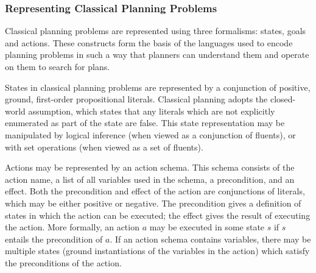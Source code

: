 \subsubsection{Representing Classical Planning Problems}

Classical planning problems are represented using three formalisms: states, goals and actions. These constructs form the basis of the languages used to encode planning problems in such a way that planners can understand them and operate on them to search for plans. 

States in classical planning problems are represented by a conjunction of positive, ground, first-order propositional literals. Classical planning adopts the closed-world assumption, which states that any literals which are not explicitly enumerated as part of the state are false. This state representation may be manipulated by logical inference (when viewed as a conjunction of fluents), or with set operations (when viewed as a set of fluents).

% 

Actions may be represented by an action schema. This schema consists of the action name, a list of all variables used in the schema, a precondition, and an effect. Both the precondition and effect of the action are conjunctions of literals, which may be either positive or negative. The precondition gives a definition of states in which the action can be executed; the effect gives the result of executing the action. More formally, an action $a$ may be executed in some state $s$ if $s$ entails the precondition of $a$. If an action schema contains variables, there may be multiple states (ground instantiations of the variables in the action) which satisfy the preconditions of the action. 

